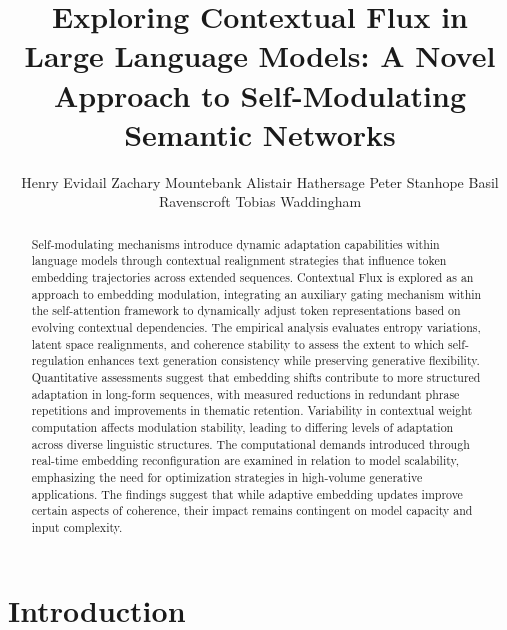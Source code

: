 \documentclass{article}
\title{Exploring Contextual Flux in Large Language Models: A Novel Approach to Self-Modulating Semantic Networks}
\author{Henry Evidail \And Zachary Mountebank \And Alistair Hathersage \And Peter Stanhope \And Basil Ravenscroft \And Tobias Waddingham}
\begin{document}
\maketitle


\begin{abstract}
Self-modulating mechanisms introduce dynamic adaptation capabilities within language models through contextual realignment strategies that influence token embedding trajectories across extended sequences. Contextual Flux is explored as an approach to embedding modulation, integrating an auxiliary gating mechanism within the self-attention framework to dynamically adjust token representations based on evolving contextual dependencies. The empirical analysis evaluates entropy variations, latent space realignments, and coherence stability to assess the extent to which self-regulation enhances text generation consistency while preserving generative flexibility. Quantitative assessments suggest that embedding shifts contribute to more structured adaptation in long-form sequences, with measured reductions in redundant phrase repetitions and improvements in thematic retention. Variability in contextual weight computation affects modulation stability, leading to differing levels of adaptation across diverse linguistic structures. The computational demands introduced through real-time embedding reconfiguration are examined in relation to model scalability, emphasizing the need for optimization strategies in high-volume generative applications. The findings suggest that while adaptive embedding updates improve certain aspects of coherence, their impact remains contingent on model capacity and input complexity. 
\end{abstract}






\section{Introduction}
\end{document}
